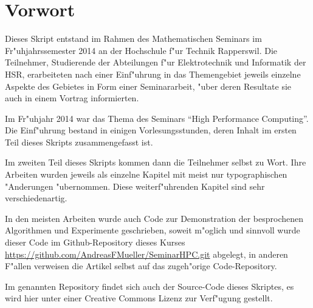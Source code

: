 \chapter*{Vorwort}
Dieses Skript entstand im Rahmen des Mathematischen Seminars
im Fr"uhjahrssemester 2014 an der Hochschule f"ur Technik Rapperswil.
Die Teilnehmer, Studierende der Abteilungen f"ur Elektrotechnik und
Informatik der
HSR, erarbeiteten nach einer Einf"uhrung in das Themengebiet jeweils
einzelne Aspekte des Gebietes in Form einer Seminararbeit, "uber
deren Resultate sie auch in einem Vortrag informierten. 

Im Fr"uhjahr 2014 war das Thema des Seminars ``High Performance Computing''.
Die Einf"uhrung bestand in einigen Vorlesungsstunden, deren
Inhalt im ersten Teil dieses Skripts zusammengefasst ist.

Im zweiten Teil dieses Skripts kommen dann die Teilnehmer
selbst zu Wort. Ihre Arbeiten wurden jeweils als einzelne
Kapitel mit meist nur typographischen "Anderungen "ubernommen.
Diese weiterf"uhrenden Kapitel sind sehr verschiedenartig.

In den meisten Arbeiten wurde auch Code zur Demonstration der 
besprochenen Algorithmen und Experimente geschrieben, soweit
m"oglich und sinnvoll wurde dieser Code im Github-Repository
dieses Kurses \url{https://github.com/AndreasFMueller/SeminarHPC.git}
abgelegt, in anderen F"allen verweisen die Artikel selbst auf
das zugeh"orige Code-Repository.

Im genannten Repository findet sich auch der Source-Code dieses
Skriptes, es wird hier unter einer Creative Commons Lizenz
zur Verf"ugung gestellt.

